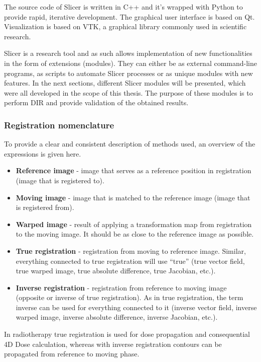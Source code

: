 The source code of Slicer is written in C++ and it's wrapped with Python to provide rapid, iterative development. The graphical user interface is based on Qt. Visualization is based on VTK, a graphical library commonly
used in scientific research.

Slicer is a research tool and as such allows implementation of new functionalities in the form of extensions (modules). They can either be as external command-line programs, 
as scripts to automate Slicer processes or as unique modules with new features. In the next sections, different Slicer modules will be presented, which were all developed in the scope of this thesis. 
The purpose of these modules is to perform DIR and provide validation of the obtained results.

\subsubsection{Registration nomenclature}

To provide a clear and consistent description of methods used, an overview of the expressions is given here.

\begin{itemize}
 \item \textbf{Reference image} - image that serves as a reference position in registration (image that is registered to).
 \item \textbf{Moving image} - image that is matched to the reference image (image that is registered from).
 \item \textbf{Warped image} - result of applying a transformation map from registration to the moving image. It should be as close to the reference image as possible.
 \item \textbf{True registration} - registration from moving to reference image. Similar, everything connected to true registration will use ``true'' (true vector field, true warped image, true absolute difference, true Jacobian, etc.).
 \item \textbf{Inverse registration} - registration from reference to moving image (opposite or inverse of true registration). As in true registration, the term inverse can be used for everything connected to it (inverse vector field, inverse warped image, inverse absolute difference, inverse Jacobian, etc.).
\end{itemize}

In radiotherapy true registration is used for dose propagation and consequential 4D Dose calculation, whereas with inverse registration contours can be propagated from reference to moving phase.


